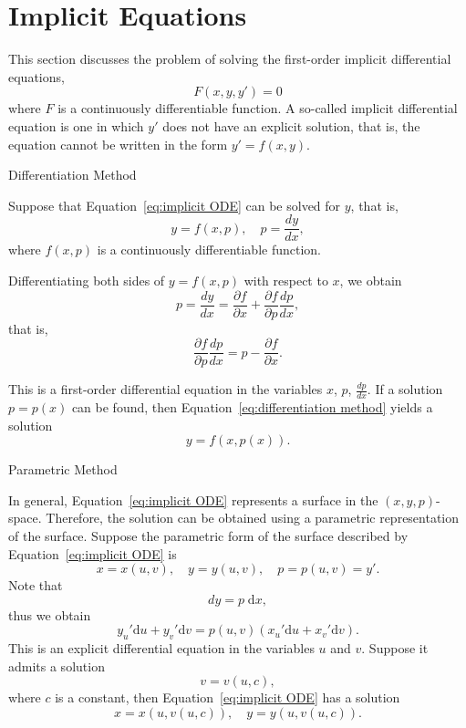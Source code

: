 \documentclass[11pt]{../../TexTemplate/elegantbook}
\begin{document}
\section{Implicit Equations}
This section discusses the problem of solving the first-order implicit differential equations,
\begin{equation}\label{eq:implicit ODE}
F(x, y, y') = 0
\end{equation}
where \(F\) is a continuously differentiable function. 
A so-called implicit differential equation is one in which \(y'\) does not have an explicit solution, 
that is, the equation cannot be written in the form \(y' = f(x, y)\).

\begin{leftbarTitle}{Differentiation Method}\end{leftbarTitle}
Suppose that Equation~\eqref{eq:implicit ODE} can be solved for \(y\), that is,
\begin{equation}\label{eq:differentiation method}
    y = f(x, p),\quad p = \frac{dy}{dx},
\end{equation}
where \(f(x, p)\) is a continuously differentiable function.

Differentiating both sides of \(y = f(x, p)\) with respect to \(x\), we obtain
\[
p = \frac{dy}{dx} = \frac{\partial f}{\partial x} + \frac{\partial f}{\partial p} \frac{dp}{dx},
\]
that is,
\begin{equation*}
\frac{\partial f}{\partial p} \frac{dp}{dx} = p - \frac{\partial f}{\partial x}.
\end{equation*}

This is a first-order differential equation in the variables \(x\), \(p\), \(\frac{dp}{dx}\). 
If a solution \(p = p(x)\) can be found, then Equation~\eqref{eq:differentiation method} yields a solution
\[
y = f(x, p(x)).
\]
\begin{leftbarTitle}{Parametric Method}\end{leftbarTitle}
In general, Equation~\eqref{eq:implicit ODE} represents a surface in the \((x, y, p)\)-space. 
Therefore, the solution can be obtained using a parametric representation of the surface. 
Suppose the parametric form of the surface described by Equation~\eqref{eq:implicit ODE} is
\[
x = x(u, v),\quad y = y(u, v),\quad p = p(u, v) = y'.
\]
Note that
\[
dy = p \; \mathrm{d}x,
\]
thus we obtain
\[
y_u' \mathrm{d}u + y_v' \mathrm{d}v = p(u, v)(x_u' \mathrm{d}u + x_v' \mathrm{d}v).
\]
This is an explicit differential equation in the variables \(u\) and \(v\). Suppose it admits a solution
\[
v = v(u, c),
\]
where \(c\) is a constant, then Equation~\eqref{eq:implicit ODE} has a solution
\[
x = x(u, v(u, c)),\quad y = y(u, v(u, c)).
\]
\end{document}
